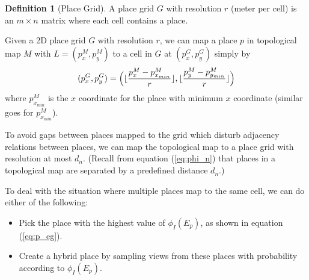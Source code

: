 \documentclass[11pt, titlepage]{article}
\theoremstyle{definition}
\newtheorem{definition}{Definition}[section]
\DeclarePairedDelimiter\floor{\lfloor}{\rfloor}
\begin{document}
\begin{definition}[Place Grid]
A place grid $G$ with resolution $r$ (meter per cell) is an $m\times n$ matrix where each cell contains a place.
\end{definition}

Given a 2D place grid $G$ with resolution $r$, we can map a place $p$ in topological map $M$ with $L=(p_x^M, p_y^M)$ to a cell in $G$ at $(p_x^G, p_y^G)$ simply by
\begin{equation}
  (p_x^G, p_y^G) = \Big(\floor{\frac{p_x^M-p_{x_{min}}^M}{r}}, \floor{\frac{p_y^M-p_{y_{min}}^M}{r}}\Big)
\end{equation}
where $p_{x_{min}}^M$ is the $x$ coordinate for the place with minimum $x$ coordinate (similar goes for $p_{x_{min}}^M$).

To avoid gaps between places mapped to the grid which disturb adjacency relations between places, we can map the topological map to a place grid with resolution at most $d_n$. (Recall from equation (\ref{eq:phi_n}) that places in a topological map are separated by a predefined distance $d_n$.)\label{sc:avoidgaps}

To deal with the situation where multiple places map to the same cell, we can do either of the following:
\begin{itemize}
\item Pick the place with the highest value of $\phi_I(E_p)$, as shown in equation (\ref{eq:p_eg}). 
\item Create a hybrid place by sampling views from these places with probability according to $\phi_I(E_p)$.
\end{itemize}
\end{document}
